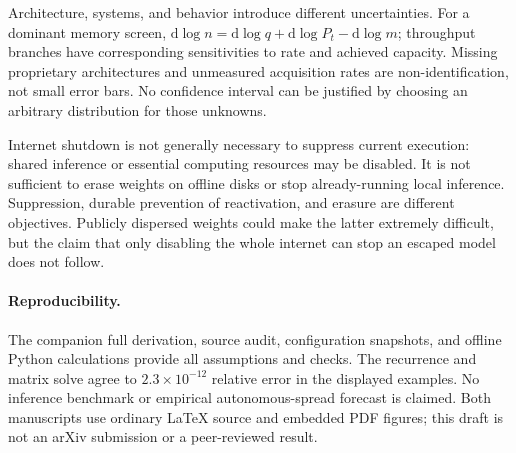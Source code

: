 \documentclass[10pt,twocolumn]{article}
\begin{document}
Architecture, systems, and behavior introduce different uncertainties. For a dominant memory screen, $\mathrm d\log n=\mathrm d\log q+\mathrm d\log P_t-\mathrm d\log m$; throughput branches have corresponding sensitivities to rate and achieved capacity. Missing proprietary architectures and unmeasured acquisition rates are non-identification, not small error bars. No confidence interval can be justified by choosing an arbitrary distribution for those unknowns.

Internet shutdown is not generally necessary to suppress current execution: shared inference or essential computing resources may be disabled. It is not sufficient to erase weights on offline disks or stop already-running local inference. Suppression, durable prevention of reactivation, and erasure are different objectives. Publicly dispersed weights could make the latter extremely difficult, but the claim that only disabling the whole internet can stop an escaped model does not follow.

\paragraph{Reproducibility.} The companion full derivation, source audit, configuration snapshots, and offline Python calculations provide all assumptions and checks. The recurrence and matrix solve agree to $2.3\times10^{-12}$ relative error in the displayed examples. No inference benchmark or empirical autonomous-spread forecast is claimed. Both manuscripts use ordinary LaTeX source and embedded PDF figures; this draft is not an arXiv submission or a peer-reviewed result.


{\footnotesize\raggedright}
\end{document}
